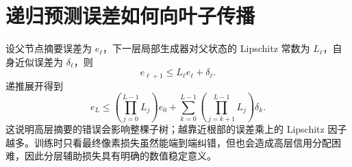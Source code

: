 \documentclass[UTF8,12pt,a4paper,fontset=none]{ctexart}
\numberwithin{equation}{section}
\begin{document}
\section{递归预测误差如何向叶子传播}
设父节点摘要误差为 $e_\ell$，下一层局部生成器对父状态的 Lipschitz 常数为 $L_\ell$，自身近似误差为 $\delta_\ell$，则
\begin{equation}
 e_{\ell+1}\le L_\ell e_\ell+\delta_\ell.
\end{equation}
递推展开得到
\begin{equation}
 e_L\le
 \left(\prod_{j=0}^{L-1}L_j\right)e_0
 +\sum_{k=0}^{L-1}
 \left(\prod_{j=k+1}^{L-1}L_j\right)\delta_k.
\end{equation}
这说明高层摘要的错误会影响整棵子树；越靠近根部的误差乘上的 Lipschitz 因子越多。训练时只看最终像素损失虽然能端到端纠错，但也会造成高层信用分配困难，因此分层辅助损失具有明确的数值稳定意义。
\end{document}
